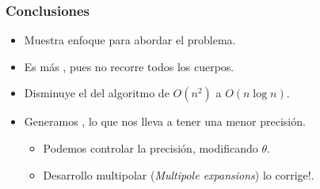 \frame
{
\frametitle{Conclusiones}
\begin{itemize}
	\item<1-> Muestra  enfoque para abordar el problema.
	\item<2-> Es más , pues no recorre todos los cuerpos.
	\item<3-> Disminuye el  del algoritmo de $O(n^2)$ a $O(n \log n)$.
	\item<4-> Generamos , lo que nos lleva a tener una menor precisión.
	\begin{itemize}
		\item<5-> Podemos controlar la precisión, modificando $\theta$.
		\item<6-> Desarrollo multipolar (\emph{Multipole expansions}) lo corrige!.  
	\end{itemize}
\end{itemize}
}
